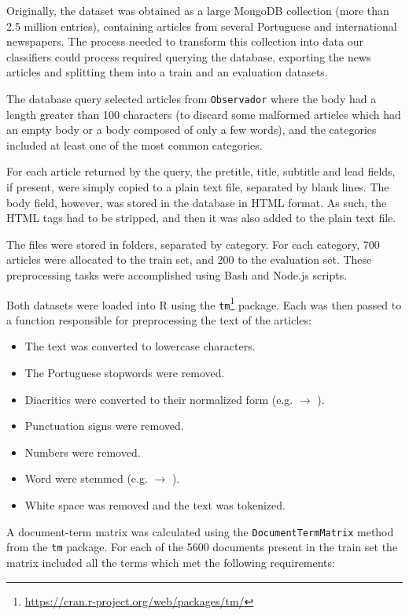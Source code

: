 \documentclass[runningheads,a4paper]{llncs}[2015/06/24]
\begin{document}
Originally, the dataset was obtained as a large MongoDB collection (more
than 2.5 million entries), containing articles from several Portuguese
and international newspapers. The process needed to transform this
collection into data our classifiers could process required querying
the database, exporting the news articles and splitting them into a
train and an evaluation datasets.

The database query selected articles from \texttt{Observador} where
the body had a length greater than 100 characters (to
discard some malformed articles which had an empty body or a body
composed of only a few words), and the categories included at least
one of the most common categories.

For each article returned by the query, the pretitle, title, subtitle
and lead fields, if present, were simply copied to a plain text file,
separated by blank lines. The body field, however, was stored in the
database in HTML format. As such, the HTML tags had to be stripped,
and then it was also added to the plain text file.

The files were stored in folders, separated by category. For each
category, 700 articles were allocated to the train set, and 200 to the
evaluation set. These preprocessing tasks were accomplished using Bash
and Node.js scripts.

Both datasets were loaded into R using the
\texttt{tm}\footnote{\url{https://cran.r-project.org/web/packages/tm/}}
package. Each was then passed to a function responsible for
preprocessing the text of the articles:

\begin{itemize}
    \item The text was converted to lowercase characters.
    \item The Portuguese stopwords were removed.
    \item Diacritics were converted to their normalized form (e.g.
         $\rightarrow$ ).
    \item Punctuation signs were removed.
    \item Numbers were removed.
    \item Word were stemmed (e.g.  $\rightarrow$
        ).
    \item White space was removed and the text was tokenized.
\end{itemize}

A document-term matrix was calculated using the
\texttt{DocumentTermMatrix} method from the \texttt{tm} package.  For
each of the 5600 documents present in the train set the matrix included
all the terms which met the following requirements:
\end{document}
